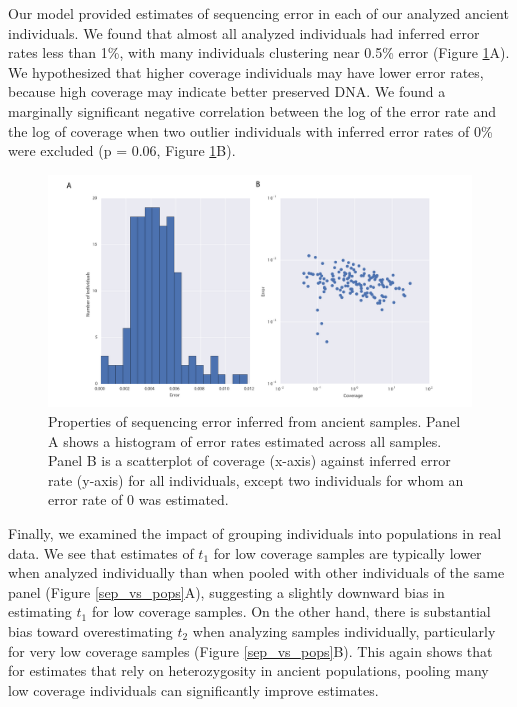 \documentclass[11pt, oneside]{article}   	%
\begin{document}
Our model provided estimates of sequencing error in each of our analyzed ancient individuals. We found that almost all analyzed individuals had inferred error rates less than 1\%, with many individuals clustering near 0.5\% error (Figure \ref{error_fig}A). We hypothesized that higher coverage individuals may have lower error rates, because high coverage may indicate better preserved DNA. We found a marginally significant negative correlation between the log of the error rate and the log of coverage when two outlier individuals with inferred error rates of 0\% were excluded (p = 0.06, Figure \ref{error_fig}B).

\begin{figure}[h] %
   \centering
   \includegraphics[width=\textwidth]{error_hist_and_scatter_vs_coverage.pdf} 
   \caption{Properties of sequencing error inferred from ancient samples. Panel A shows a histogram of error rates estimated across all samples. Panel B is a scatterplot of coverage (x-axis) against inferred error rate (y-axis) for all individuals, except two individuals for whom an error rate of 0 was estimated.}
   \label{error_fig}
\end{figure}

Finally, we examined the impact of grouping individuals into populations in real data.  We see that estimates of $t_1$ for low coverage samples are typically lower when analyzed individually than when pooled with other individuals of the same panel (Figure \ref{sep_vs_pops}A), suggesting a slightly downward bias in estimating $t_1$ for low coverage samples. On the other hand, there is substantial bias toward overestimating $t_2$ when analyzing samples individually, particularly for very low coverage samples (Figure \ref{sep_vs_pops}B). This again shows that for estimates that rely on heterozygosity in ancient populations, pooling many low coverage individuals can significantly improve estimates.
\end{document}
